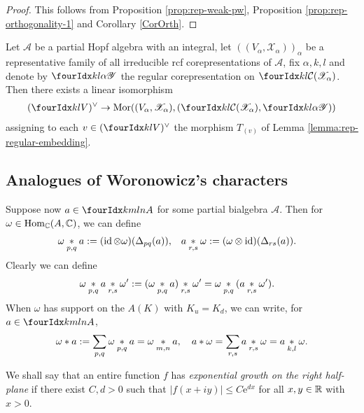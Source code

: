 \begin{proof} This follows from Proposition \ref{prop:rep-weak-pw}, Proposition \ref{prop:rep-orthogonality-1} and Corollary \ref{CorOrth}.
\end{proof}
\begin{Cor} \label{cor:rep-pw-morphisms}
  Let $\mathscr{A}$ be a partial Hopf algebra with an integral, let
  $((V_{\alpha},\mathscr{X}_{\alpha}))_{\alpha}$ be a representative
  family of all irreducible rcf corepresentations of $\mathscr{A}$,
  fix $\alpha,k,l$ and denote by $\Gr{\mathscr{Y}}{k}{l}{}{\alpha}$
  the regular corepresentation on
  $\Gru{\mathcal{C}(\mathscr{X}_{\alpha})}{k}{l}$. Then there exists a
  linear isomorphism
  \begin{align*}
    \dual{( \Gru{V}{k}{l})} \to
    \Mor((V_{\alpha},\mathscr{X}_{\alpha}),
    (\Gru{\mathcal{C}(\mathscr{X}_{\alpha})}{k}{l},\Gr{\mathscr{Y}}{k}{l}{}{\alpha}))
  \end{align*}
  assigning to each $v\in     \dual{( \Gru{V}{k}{l})}$ the morphism
  $T_{(v)}$ of Lemma \ref{lemma:rep-regular-embedding}.
\end{Cor}

\subsection{Analogues of Woronowicz's  characters}

Suppose now $a\in \Gr{A}{k}{l}{m}{n}$ for some partial bialgebra $\mathscr{A}$. Then for $\omega \in \operatorname{Hom}_{\mathbb{C}}(A,\mathbb{C})$, we can define
\begin{align*}
  \omega \underset{p,q}{\ast} a
&:= (\operatorname{id} \otimes \omega) (\Delta_{pq}(a)), & a \underset{r,s}{\ast}
\omega&:=(\omega \otimes \operatorname{id})(\Delta_{rs}(a)).\end{align*} Clearly we can define
\begin{align*} \omega \underset{p,q}{\ast} a \underset{r,s}{\ast}
\omega'&:= (\omega \underset{p,q}{\ast} a)\underset{r,s}{\ast} \omega' = \omega \underset{p,q}{\ast}(a \underset{r,s}{\ast} \omega').\end{align*}
When $\omega$ has support on the $A(K)$ with $K_u=K_d$, we can write, for $a\in \Gr{A}{k}{l}{m}{n}$, \[\omega\ast a := \sum_{p,q} \omega\underset{p,q}{\ast}a = \omega\underset{m,n}{\ast}a,\quad  a\ast \omega = \sum_{r,s} a\underset{r,s}{\ast}\omega = a\underset{k,l}{\ast}\omega.\] 

We shall say that an entire function $f$ has \emph{exponential growth
  on the right half-plane} if there exist $C,d>0$ such that $|f(x+iy)|\leq
C\mathrm{e}^{dx}$  for all $x,y\in \mathbb{R}$ with $x>0$. 

